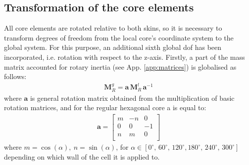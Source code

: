\documentclass[a4paper,12pt]{article}
\begin{document}
{\subsection{Transformation of the core elements}
\label{sec:transformation}
All core elements are rotated relative to both skins, so it is necessary to transform degrees of freedom from the local core's coordinate system to the global system.
For this purpose, an additional sixth global dof has been incorporated, i.e. rotation with respect to the z-axis.
Firstly, a part of the mass matrix accounted for rotary inertia (see App. \ref{app:matrices}) is globalised as follows:
\begin{eqnarray}
\textbf{M}_R^g=\textbf{a}\,\textbf{M}_R^l\,\textbf{a}^{-1}
\label{eq:inertia}
\end{eqnarray}
where \(\textbf{a}\) is general rotation matrix obtained from the multiplication of basic rotation matrices, and for the regular hexagonal core a is equal to:
\begin{eqnarray}
\textbf{a}=\left [ 
\begin{array}{ccc}
m & -n & 0\\
0 & 0 & -1\\
n & m & 0\\
\end{array}
\right ]
\label{eq:rotation}
\end{eqnarray}
where \(m=\cos(\alpha),\:n=\sin(\alpha)\), for \(\alpha\in{[0^\circ,\,60^\circ,\,120^\circ,180^\circ,\,240^\circ,\,300^\circ]}\) depending on which wall of the cell it is applied to.

}
\end{document}
